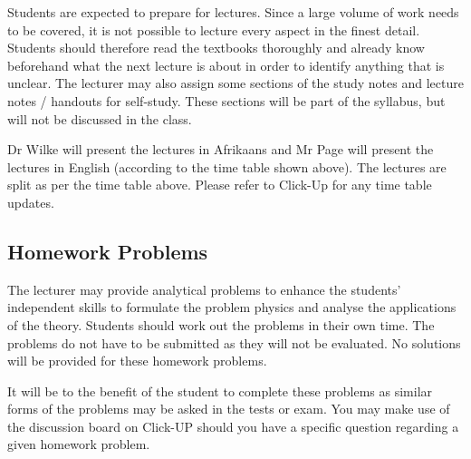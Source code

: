         Students are expected to prepare for lectures. Since a large volume of work
        needs to be covered, it is not possible to lecture every aspect in the 
        finest detail. Students should therefore read the textbooks thoroughly 
        and already know beforehand what the next lecture is about in order to 
        identify anything that is unclear. The lecturer may also assign some 
        sections of the study notes and lecture notes / handouts for self-study. 
        These sections will be part of the syllabus, but will not be discussed 
        in the class.
        
        Dr Wilke will present the lectures in Afrikaans and Mr Page will present
        the lectures in English (according to the time table shown above). The
        lectures are split as per the time table above. Please refer to Click-Up 
        for any time table updates.
        
    \subsection{Homework Problems}
        The lecturer may provide analytical problems to enhance the students’
        independent skills to formulate the problem physics and analyse the 
        applications of the theory. Students should work out the problems in
        their own time. The problems do not have to be submitted as they will
        not be evaluated. No solutions will be provided for these homework 
        problems.
        
        It will be to the benefit of the student to complete these problems as
        similar forms of the problems may be asked in the tests or exam.
        You may make use of the discussion board on Click-UP should you have a 
        specific question regarding a given homework problem.
    

